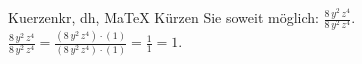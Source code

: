 \begin{MAufgabe}{Kuerzen}{kr, dh, MaTeX}
K\"urzen Sie soweit m\"oglich: $\frac{8\, y^2\, z^4}{8\, y^2\, z^4}$.\\ 
\ifLsg\MLoesung
\quad $\frac{8\, y^2\, z^4}{8\, y^2\, z^4}=\frac{(8\, y^2\, z^4)\cdot(1)}{(8\, y^2\, z^4)\cdot(1)}=\frac{1}{1}=1$.\else\relax\fi
 \end{MAufgabe}